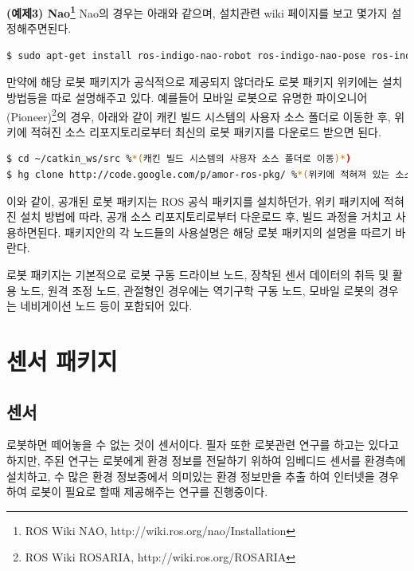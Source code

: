 \textbf{(예제3) Nao\footnote{ROS Wiki NAO, http://wiki.ros.org/nao/Installation}}
Nao의 경우는 아래와 같으며, 설치관련 wiki 페이지를 보고 몇가지 설정해주면된다.
\begin{lstlisting}[language=bash]
$ sudo apt-get install ros-indigo-nao-robot ros-indigo-nao-pose ros-indigo-nao-msgs ros-indigo-nao-driver ros-indigo-nao-description ros-indigo-nao-bringup ros-indigo-humanoid-nav-msg
\end{lstlisting}

만약에 해당 로봇 패키지가 공식적으로 제공되지 않더라도 로봇 패키지 위키에는 설치 방법등을 따로 설명해주고 있다. 예를들어 모바일 로봇으로 유명한 파이오니어(Pioneer)\footnote{ROS Wiki ROSARIA, http://wiki.ros.org/ROSARIA}의 경우, 아래와 같이 캐킨 빌드 시스템의 사용자 소스 폴더로 이동한 후, 위키에 적혀진 소스 리포지토리로부터 최신의 로봇 패키지를 다운로드 받으면 된다. 

\begin{lstlisting}[language=bash]
$ cd ~/catkin_ws/src %*(캐킨 빌드 시스템의 사용자 소스 폴더로 이동)*)
$ hg clone http://code.google.com/p/amor-ros-pkg/ %*(위키에 적혀져 있는 소스 리포지토리로부터 소스 다운로드)*)
\end{lstlisting}

이와 같이, 공개된 로봇 패키지는 ROS 공식 패키지를 설치하던가, 위키 패키지에 적혀진 설치 방법에 따라, 공개 소스 리포지토리로부터 다운로드 후, 빌드 과정을 거치고 사용하면된다. 패키지안의 각 노드들의 사용설명은 해당 로봇 패키지의 설명을 따르기 바란다.

로봇 패키지는 기본적으로 로봇 구동 드라이브 노드, 장착된 센서 데이터의 취득 및 활용 노드, 원격 조정 노드, 관절형인 경우에는 역기구학 구동 노드, 모바일 로봇의 경우는 네비게이션 노드 등이 포함되어 있다. 


\section{센서 패키지}

\subsection{센서}

로봇하면 떼어놓을 수 없는 것이 센서이다. 필자 또한 로봇관련 연구를 하고는 있다고 하지만, 주된 연구는 로봇에게 환경 정보를 전달하기 위하여 임베디드 센서를 환경측에 설치하고, 수 많은 환경 정보중에서 의미있는 환경 정보만을 추출 하여 인터넷을 경우하여 로봇이 필요로 할때 제공해주는 연구를 진행중이다. 

